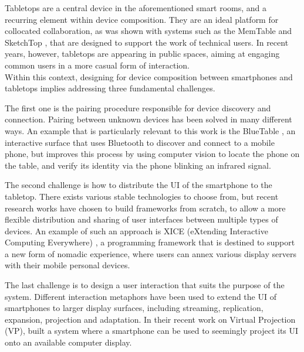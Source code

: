 Tabletops are a central device in the aforementioned smart rooms, and a recurring element within device composition.
They are an ideal platform for collocated collaboration, as was shown with systems such as the MemTable \citep{Hunter:2011:memtable} and SketchTop \citep{Clifton:2010:sketchtop}, that are designed to support the work of technical users.
In recent years, however, tabletops are appearing in public spaces, aiming at engaging common users in a more casual form of interaction.
\\
\linebreak
Within this context, designing for device composition between smartphones and tabletops implies addressing three fundamental challenges.

The first one is the pairing procedure responsible for device discovery and connection.
Pairing between unknown devices has been solved in many different ways.
An example that is particularly relevant to this work is the BlueTable \citep{Wilson:2007:bluetable}, an interactive surface that uses Bluetooth to discover and connect to a mobile phone, but improves this process by using computer vision to locate the phone on the table, and verify its identity via the phone blinking an infrared signal.

The second challenge is how to distribute the UI of the smartphone to the tabletop.
There exists various stable technologies to choose from, but recent research works have chosen to build frameworks from scratch, to allow a more flexible distribution and sharing of user interfaces between multiple types of devices.
An example of such an approach is XICE (eXtending Interactive Computing Everywhere) \citep{Arthur:2011:xice}, a programming framework that is destined to support a new form of nomadic experience, where users can annex various display servers with their mobile personal devices.

The last challenge is to design a user interaction that suits the purpose of the system.
Different interaction metaphors have been used to extend the UI of smartphones to larger display surfaces, including streaming, replication, expansion, projection and adaptation.
In their recent work on Virtual Projection (VP), \cite{Baur:2012:virtualprojection} built a system where a smartphone can be used to seemingly project its UI onto an available computer display.

